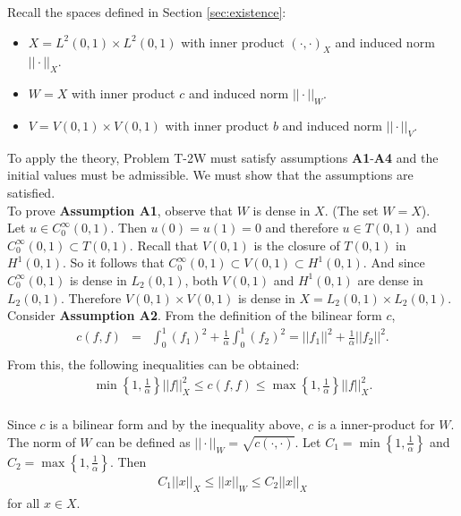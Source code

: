 \documentclass[../../main.tex]{subfiles}
\begin{document}
Recall the spaces defined in Section \ref{sec:existence}:
\begin{itemize}
	\item[] $X = L^2(0,1)\times L^2(0,1)$ with inner product $(\cdot,\cdot)_X$ and induced norm $||\cdot||_X$.
	\item[] $W = X$ with inner product $c$ and induced norm $||\cdot||_W$.
	\item[] $V  = V(0,1)\times V(0,1)$ with inner product $b$ and induced norm $||\cdot||_V$.
\end{itemize}

To apply the theory, Problem T-2W must satisfy assumptions \textbf{A1}-\textbf{A4} and the initial values must be admissible. We must show that the assumptions are satisfied.\\

To prove \textbf{Assumption A1}, observe that $W$ is dense in $X$. (The set $W = X$).\\

Let $u \in C_0^\infty(0,1)$. Then $u(0) = u(1) = 0$ and therefore $u \in T(0,1)$ and $C_0^\infty(0,1) \subset T(0,1)$. Recall that $V(0,1)$ is the closure of $T(0,1)$ in $H^1(0,1)$. So it follows that $C_0^\infty(0,1) \subset V(0,1) \subset H^1(0,1)$. And since $C_0^\infty(0,1)$ is dense in $L_2(0,1)$, both $V(0,1)$ and $H^1(0,1)$ are dense in $L_2(0,1)$. Therefore $V(0,1)\times V(0,1)$ is dense in $X = L_2(0,1) \times L_2(0,1)$.\\

Consider \textbf{Assumption A2}. From the definition of the bilinear form $c$,
\begin{eqnarray*}
	c(f,f) & = & \int_0^1  (f_1)^2 + \frac{1}{\alpha}\int_0^1  (f_2)^2 = ||f_1||^2 + \frac{1}{\alpha}||f_2||^2.\\
\end{eqnarray*}
From this, the following inequalities can be obtained:
\begin{eqnarray*}
	\min\left\{1, \frac{1}{\alpha}\right\} ||f||_{X}^2 \leq	c(f,f)	\leq \max\left\{1, \frac{1}{\alpha}\right\} ||f||_{X}^2.\\
\end{eqnarray*}

Since $c$ is a bilinear form and by the inequality above, $c$ is a inner-product for $W$. The norm of $W$ can be defined as $||\cdot||_W = \sqrt{c(\cdot,\cdot)}$. Let $C_1 = \min\left\{1, \frac{1}{\alpha}\right\}$ and $C_2 = \max\left\{1, \frac{1}{\alpha}\right\}$. Then
\begin{eqnarray}
	C_1||x||_X \leq ||x||_W \leq C_2||x||_X \label{C}
\end{eqnarray} for all $x \in X$.\\
\end{document}
